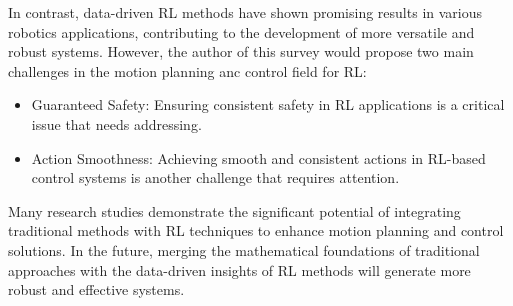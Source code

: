 \documentclass{article}
\begin{document}
In contrast, data-driven RL methods have shown promising results in various robotics applications, contributing to the development of more versatile and robust systems. However, the author of this survey would propose two main challenges in the motion planning anc control field for RL:
\begin{itemize}
  \item Guaranteed Safety: Ensuring consistent safety in RL applications is a critical issue that needs addressing. 
  \item Action Smoothness: Achieving smooth and consistent actions in RL-based control systems is another challenge that requires attention.
\end{itemize}

Many research studies demonstrate the significant potential of integrating traditional methods with RL techniques to enhance motion planning and control solutions. In the future, merging the mathematical foundations of traditional approaches with the data-driven insights of RL methods will generate more robust and effective systems.

\printbibliography
\end{document}
